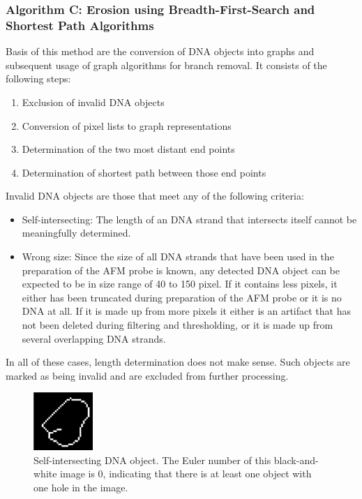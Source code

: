 \documentclass{article}
\begin{document}
\subsubsection{Algorithm C: Erosion using Breadth-First-Search and Shortest Path Algorithms} \label{sec:bfs_ssp_length_estimation}
Basis of this method are the conversion of DNA objects into graphs and subsequent usage of graph algorithms for branch removal. It consists of the following steps:
\begin{enumerate}
	\item Exclusion of invalid DNA objects
	\item Conversion of pixel lists to graph representations
	\item Determination of the two most distant end points
	\item Determination of shortest path between those end points
\end{enumerate}
Invalid DNA objects are those that meet any of the following criteria:
\begin{itemize}
	\item Self-intersecting: The length of an DNA strand that intersects itself cannot be meaningfully determined.
	\item Wrong size: Since the size of all DNA strands that have been used in the preparation of the AFM probe is known, any detected DNA object can be expected to be in size range of 40 to 150 pixel. If it contains less pixels, it either has been truncated during preparation of the AFM probe or it is no DNA at all. If it is made up from more pixels it either is an artifact that has not been deleted during filtering and thresholding, or it is made up from several overlapping DNA strands. 
\end{itemize}
In all of these cases, length determination does not make sense. Such objects are marked as being invalid and are excluded from further processing.
\begin{figure}[htb!]
	\centering
	\includegraphics[width = 0.2\textwidth]{dna_with_loop.png}
	\caption{Self-intersecting DNA object. The Euler number of this black-and-white image is 0, indicating that there is at least one object with one hole in the image.}
	\label{fig:dna_with_loop}
\end{figure}
\end{document}
